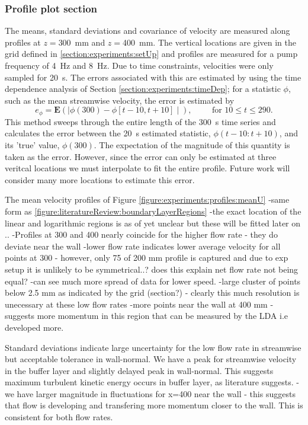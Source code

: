 \documentclass[12pt,oneside,a4paper]{article}
\begin{document}
\subsubsection{Profile plot section}
The means, standard deviations and covariance of velocity are measured along profiles at $z=$\SI{300}{mm} and $z=$\SI{400}{mm}. The vertical locations are given in the grid defined in \ref{section:experiments:setUp} and profiles are measured for a pump frequency of \SI{4}{Hz} and \SI{8}{Hz}. Due to time constraints, velocities were only sampled for \SI{20}{s}. The errors associated with this are estimated by using the time dependence analysis of Section \ref{section:experiments:timeDep}; for a statistic $\phi$, such as the mean streamwise velocity, the error is estimated by
\begin{equation}
e_\phi = \mathbf{E} \left( \mid
				\phi(300) - \phi[t-10,t+10]
					\mid \right), \hspace{1cm} \text{for } 10 \leq t \leq 290.
\end{equation}
This method sweeps through the entire length of the \SI{300}{s} time series and calculates the error between the \SI{20}{s} estimated statistic, $\phi(t-10:t+10)$, and its 'true' value, $\phi(300)$. The expectation of the magnitude of this quantity is taken as the error. However, since the error can only be estimated at three veritcal locations we must interpolate to fit the entire profile. Future work will consider many more locations to estimate this error. 

The mean velocity profiles of Figure \ref{figure:experiments:profiles:meanU} 
-same form as \ref{figure:literatureReview:boundaryLayerRegions}
-the exact location of the linear and logarithmic regions is as of yet unclear but these will be fitted later on .. 
-Profiles at 300 and 400 nearly coincide for the higher flow rate - they do deviate near the wall
-lower flow rate indicates lower average velocity for all points at 300 - however, only 75 of 200 mm profile is captured and due to exp setup it is unlikely to be symmetrical..? does this explain net flow rate not being equal?
-can see much more spread of data for lower speed.
-large cluster of points below 2.5 mm as indicated by the grid (section?) - clearly this much resolution is unecessary at these low flow rates 
-more points near the wall at 400 mm - suggests more momentum in this region that can be measured by the LDA i.e developed more. 

Standard deviations indicate large uncertainty for the low flow rate in streamwise but acceptable tolerance in wall-normal. We have a peak for streamwise velocity in the buffer layer and slightly delayed peak in wall-normal. This suggests maximum turbulent kinetic energy occurs in buffer layer, as literature suggests.
-we have larger magnitude in fluctuations for x=400 near the wall - this suggests that flow is developing and transfering more momentum closer to the wall. This is consistent for both flow rates. 
\end{document}
